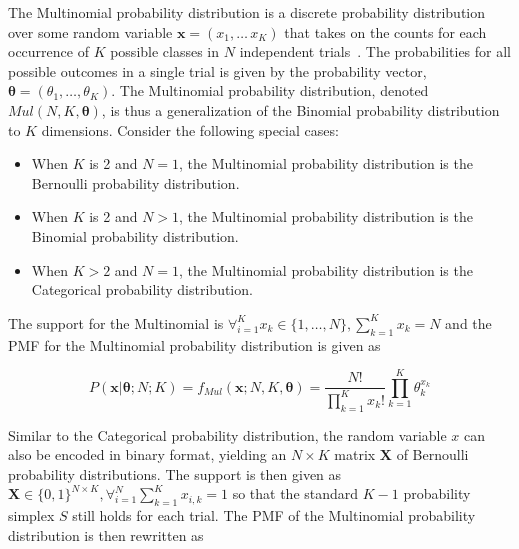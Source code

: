 The Multinomial probability distribution is a discrete probability distribution over some random variable $\boldsymbol{x} = (x_{1}, \dots\, x_{K})$ that takes on the counts for each occurrence of $K$ possible classes in $N$ independent trials~\cite{ref:wackerly:2014}. The probabilities for all possible outcomes in a single trial is given by the probability vector, $\boldsymbol{\theta} = (\theta_{1}, \dots, \theta_{K})$. The Multinomial probability distribution, denoted $Mul(N, K, \boldsymbol{\theta})$, is thus a generalization of the Binomial probability distribution to $K$ dimensions. Consider the following special cases:

\begin{itemize}
      \item When $K$ is 2 and $N = 1$, the Multinomial probability distribution is the Bernoulli probability distribution.
      \item When $K$ is 2 and $N > 1$, the Multinomial probability distribution is the Binomial probability distribution.
      \item When $K > 2$ and $N = 1$, the Multinomial probability distribution is the Categorical probability distribution.
\end{itemize}

The support for the Multinomial is $\forall_{i=1}^{K} x_{k} \in \{1, \dots, N\}, \sum_{k=1}^{K}x_{k} = N$ and the \acs{PMF} for the Multinomial probability distribution is given as

\begin{equation}
      \label{eq:probability:probability_distributions:multinomial:pmf}
      P(\boldsymbol{x} \vert \boldsymbol{\theta}; N; K) = f_{Mul}(\boldsymbol{x}; N, K, \boldsymbol{\theta}) = \frac{N!}{\prod_{k=1}^{K}x_{k}!} \prod_{k=1}^{K}\theta_{k}^{x_{k}}
\end{equation}

Similar to the Categorical probability distribution, the random variable $x$ can also be encoded in binary format, yielding an $N \times K$ matrix $\boldsymbol{X}$ of Bernoulli probability distributions. The support is then given as $\boldsymbol{X} \in \{0, 1\}^{N \times K}, \forall_{i=1}^{N}\sum_{k=1}^{K} x_{i,k} = 1$ so that the standard $K-1$ probability simplex $S$ still holds for each trial. The \acs{PMF} of the Multinomial probability distribution is then rewritten as

